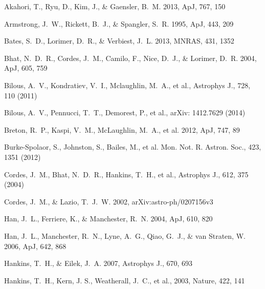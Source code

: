 \begin{thebibliography}{99}
\begin{multicols}{2}{\footnotesize

Akahori, T., Ryu, D., Kim, J., \& Gaensler, B.~M. 2013, ApJ, 767, 150

Armstrong, J.~W., Rickett, B.~J., \& Spangler, S.~R. 1995, ApJ, 443, 209

Bates, S.~D., Lorimer, D.~R., \& Verbiest, J.~L. 2013, MNRAS, 431, 1352

Bhat, N.~D.~R., Cordes, J.~M., Camilo, F., Nice, D.~J., \& Lorimer, D.~R. 2004, ApJ, 605, 759

Bilous, A.~V., Kondratiev, V.~I., Mclaughlin, M.~A., et al., Astrophys J., 728, 110 (2011)

Bilous, A.~V., Pennucci, T.~T., Demorest, P., et al., arXiv: 1412.7629 (2014)

Breton, R.~P., Kaspi, V.~M., McLaughlin, M.~A., et al. 2012, ApJ, 747, 89

Burke-Spolaor, S., Johnston, S., Bailes, M., et al. Mon. Not. R. Astron. Soc., 423, 1351 (2012)

Cordes, J.~M., Bhat, N.~D.~R., Hankins, T.~H., et al., Astrophys J., 612, 375 (2004)

Cordes, J.~M., \& Lazio, T.~J.~W. 2002, arXiv:astro-ph/0207156v3

Han, J.~L., Ferriere, K., \& Manchester, R.~N. 2004, ApJ, 610, 820

Han, J.~L., Manchester, R.~N., Lyne, A.~G., Qiao, G.~J., \& van Straten, W. 2006, ApJ, 642, 868

Hankins, T.~H., \& Eilek, J.~A. 2007, Astrophys J., 670, 693

Hankins, T.~H., Kern, J. S., Weatherall, J.~C., et al., 2003, Nature, 422, 141

}
\end{multicols}
\end{thebibliography}
